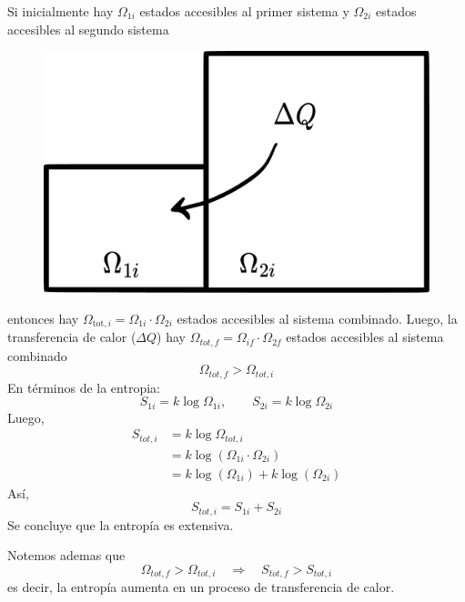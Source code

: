 \begin{ej}
	Si inicialmente hay $\Omega_{1i}$ estados accesibles al primer sistema y $\Omega_{2i}$ estados accesibles al segundo sistema
	
\begin{figure}[h!]
	\centering
	\includegraphics[scale=0.25]{fig/transf-calor.pdf}
\end{figure}

entonces hay $\Omega_{\text{tot},i}=\Omega_{1i}\cdot \Omega_{2i}$ estados accesibles al sistema combinado. Luego, la transferencia de calor ($\Delta Q$) hay $\Omega_{tot,f}=\Omega_{if}\cdot \Omega_{2f}$ estados accesibles al sistema combinado
\begin{equation}
  \Omega_{tot,f}>\Omega_{tot,i}
\end{equation}
En términos de la entropia:
\begin{equation}
  S_{1i}=k\log \Omega_{1i},\qquad  S_{2i}=k\log \Omega_{2i}
\end{equation}
Luego,
\begin{align}
  S_{tot,i}&=k\log \Omega_{tot,i}\\
  &=k\log (\Omega_{1i}\cdot \Omega_{2i})\\
  &=k\log (\Omega_{1i})+k\log (\Omega_{2i})
\end{align}
Así,
\begin{equation}
  S_{tot,i}=S_{1i}+S_{2i}
\end{equation}
Se concluye que la entropía es extensiva.

Notemos ademas que
\begin{equation}
  \Omega_{tot,f}>\Omega_{tot,i}\quad \Rightarrow \quad S_{tot,f}>S_{tot,i}
\end{equation}
es decir, la entropía aumenta en un proceso  de transferencia de calor.
\end{ej}


